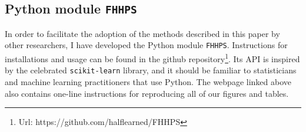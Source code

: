 \begin{table}[H]
  \singlespacing
  \caption{Performance measures for estimates of Corr[A_1, B_1]}
  
\end{table}

 
\subsection{Python module \texttt{FHHPS}}

In order to facilitate the adoption of the methods described in this paper by other researchers, I have developed the Python module \texttt{FHHPS}. Instructions for installations and usage can be found in the github repository\footnote{Url: https://github.com/halflearned/FHHPS}. Its API is inspired by the celebrated \texttt{scikit-learn} library\cite{sklearn_api}, and it should be familiar to statisticians and machine learning practitioners that use Python. The webpage linked above also contains one-line instructions for reproducing all of our figures and tables. 

\clearpage
\begin{landscape}
\begin{table}[H]
  \singlespacing
  \caption{Panel regressions}
  
  \label{tab:panel_lm_table}
\end{table}
\end{landscape}


 


